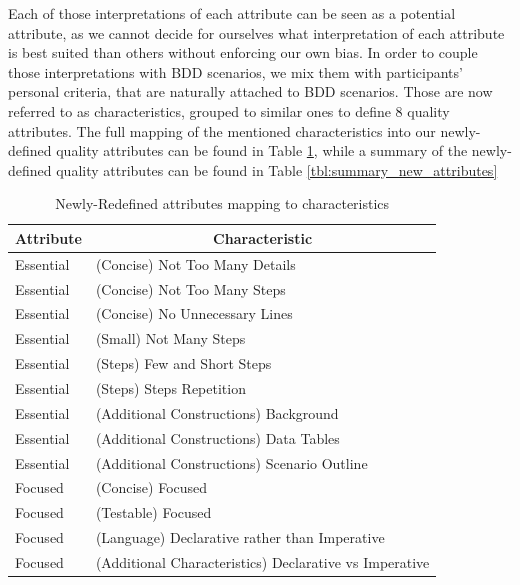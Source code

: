 Each of those interpretations of each attribute can be seen as a potential attribute, as we cannot decide for ourselves what interpretation of each attribute is best suited than others without enforcing our own bias. In order to couple those interpretations with BDD scenarios, we mix them with participants' personal criteria, that are naturally attached to BDD scenarios. Those are now referred to as characteristics, grouped to similar ones to define 8 quality attributes. The full mapping of the mentioned characteristics into our newly-defined quality attributes can be found in Table \ref{tbl:characteristics_mapping}, while a summary of the newly-defined quality attributes can be found in Table \ref{tbl:summary_new_attributes}


\begin{table}[t!]
    \caption{Newly-Redefined attributes mapping to characteristics}
    \label{tbl:characteristics_mapping}
    \centering
    \begin{tabular}{|m{2cm}|m{10cm}|}
        \hline
        \multicolumn{1}{|c|}{\textbf{Attribute}} & \multicolumn{1}{|c|}{\textbf{Characteristic}}\\
        \hline
        Essential & (Concise) Not Too Many Details\\
        \hline
        Essential & (Concise) Not Too Many Steps\\
        \hline
        Essential & (Concise) No Unnecessary Lines\\
        \hline
        Essential & (Small) Not Many Steps\\
        \hline
        Essential & (Steps) Few and Short Steps\\
        \hline
        Essential & (Steps) Steps Repetition\\
        \hline
        Essential & (Additional Constructions) Background\\
        \hline
        Essential & (Additional Constructions) Data Tables\\
        \hline
        Essential & (Additional Constructions) Scenario Outline\\
        \hline
        Focused & (Concise) Focused\\
        \hline
        Focused & (Testable) Focused\\
        \hline
        Focused & (Language) Declarative rather than Imperative\\
        \hline
        Focused & (Additional Characteristics) Declarative vs Imperative\\

\end{tabular}
\end{table}
